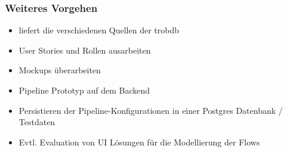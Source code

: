 \documentclass[class=scrbook,crop=false]{standalone}
\begin{document}
	\subsubsection*{Weiteres Vorgehen}
	\begin{itemize}
		\item \proff liefert die verschiedenen Quellen der \gls{trobdb}
		\item User Stories und Rollen ausarbeiten
		\item Mockups überarbeiten
		\item Pipeline Prototyp auf dem Backend
		\item Persistieren der Pipeline-Konfigurationen in einer Postgres Datenbank / Testdaten
		\item Evtl. Evaluation von UI Lösungen für die Modellierung der Flows
	\end{itemize}
	
\end{document}
